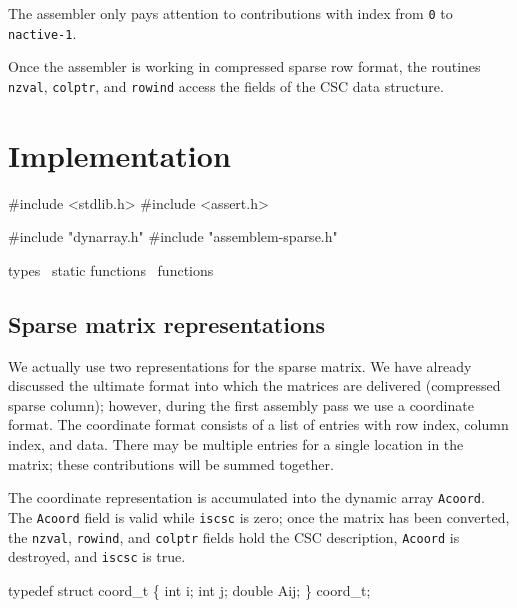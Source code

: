 The assembler only pays attention to contributions with
index from {\tt{}0} to {\tt{}nactive-1}. 

Once the assembler is working in compressed sparse row format,
the routines {\tt{}nzval}, {\tt{}colptr}, and {\tt{}rowind} access the
fields of the CSC data structure.


\section{Implementation}

\nwenddocs{}\endmoddef
#include <stdlib.h>
#include <assert.h>

#include "dynarray.h"
#include "assemblem-sparse.h"

\LA{}types~{\nwtagstyle{}}\RA{}
\LA{}static functions~{\nwtagstyle{}}\RA{}
\LA{}functions~{\nwtagstyle{}}\RA{}
\nwendcode{}\nwdocspar

\subsection{Sparse matrix representations}

We actually use two representations for the sparse matrix.
We have already discussed the ultimate format into which the
matrices are delivered (compressed sparse column); however,
during the first assembly pass we use a coordinate format.
The coordinate format consists of a list of entries
with row index, column index, and data.  There may be multiple
entries for a single location in the matrix; these contributions
will be summed together.

The coordinate representation is accumulated into the dynamic array
{\tt{}Acoord}.  The {\tt{}Acoord} field is valid while {\tt{}is{}csc} is zero;
once the matrix has been converted, the {\tt{}nzval}, {\tt{}rowind}, and
{\tt{}colptr} fields hold the CSC description, {\tt{}Acoord} is destroyed, 
and {\tt{}is{}csc} is true.

\nwenddocs{}\endmoddef
typedef struct coord_t \{
    int    i;
    int    j;
    double Aij;
\} coord_t;

